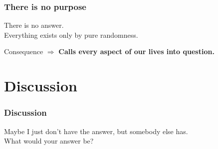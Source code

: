 \documentclass{beamer}
\begin{document}
    \begin{frame}
    	\frametitle{There is no purpose}
    	There is no answer. \\ \pause
    	Everything exists only by pure randomness. \\ \pause
    	\begin{alertblock}{Consequence}
    		$\Rightarrow$ \textbf{Calls every aspect of our lives into question.}
		\end{alertblock}
    \end{frame}
    
    
    \section{Discussion}
    
    \begin{frame}
    	\frametitle{Discussion}
    	
    	\begin{center}
    	Maybe I just don't have the answer, but somebody else has. \\
    	What would your answer be?
    	\end{center}
    	
    \end{frame}
    
\end{document}
